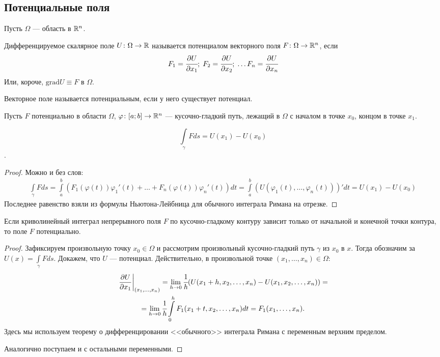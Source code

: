 \subsection{Потенциальные поля}
Пусть $\Omega$ --- область в $\mathbb{R}^n$.
\begin{Def}
    Дифференцируемое скалярное поле $U\colon \Omega \to \mathbb{R}$ называется потенциалом векторного поля $F \colon \Omega \to \mathbb{R}^n$, если 
    $$
        F_1 = \cfrac{\partial U}{\partial x_1};\; F_2 = \cfrac{\partial U}{\partial x_2};\; \ldots F_n = \cfrac{\partial U}{\partial x_n}
    $$
    Или, короче, $\mathrm{grad}U\equiv F$ в $\Omega$.
\end{Def}
\begin{Def}
    Векторное поле называется потенциальным, если у него существует потенциал.
\end{Def}
Пусть $F$ потенциально в области $\Omega$, $\varphi\colon [a;b] \to \mathbb{R}^n$ --- кусочно-гладкий путь, лежащий в $\Omega$ с началом в точке $x_{0}$, концом в точке $x_1$.
\begin{Statement}
    $$ \int\limits_\gamma Fds = U(x_1) - U(x_0) $$.
\end{Statement}
\begin{proof}
    Можно и без слов:
    \begin{gather}
        \int\limits_\gamma Fds = \int\limits_a^b  \left( F_1(\varphi(t))\varphi_1'(t) + \ldots + F_n(\varphi(t))\varphi_n'(t) \right) dt = \int\limits_a^b (U(\varphi_1(t), \ldots, \varphi_n(t)))'dt = U(x_1) - U(x_0)
    \end{gather}
    Последнее равенство взяли из формулы Ньютона-Лейбница для обычного интеграла Римана на отрезке.
\end{proof}
\begin{Statement}
    Если криволинейный интеграл непрерывного поля $F$ по кусочно-гладкому контуру зависит только от начальной и конечной точки контура, то поле $F$ потенциально.
\end{Statement}
\begin{proof}
    Зафиксируем произвольную точку $x_0 \in \Omega$ и рассмотрим произвольный кусочно-гладкий путь $\gamma$ из $x_0$ в $x$. Тогда обозначим за $U(x) = \int\limits_\gamma Fds$. Докажем, что $U$ --- потенциал. Действительно, в произвольной точке $(x_1, \ldots, x_n) \in \Omega$:
    \begin{gather}
    \left.\frac{\partial U}{\partial x_1}\right|_{(x_1, \ldots, x_n)} = \lim\limits_{h \to 0}\cfrac{1}{h}(U(x_1 + h, x_2, \ldots, x_n) - U(x_1, x_2, \ldots, x_n)) =\\
    = \lim\limits_{h\to 0}\cfrac{1}{h}\int\limits_{0}^{h} F_1(x_1 + t, x_2, \ldots, x_n)dt = F_1(x_1, \ldots, x_n).
    \end{gather}
    Здесь мы используем теорему о дифференцировании <<обычного>> интеграла Римана с переменным верхним пределом.
    
    Аналогично поступаем и с остальными переменными.
\end{proof}

